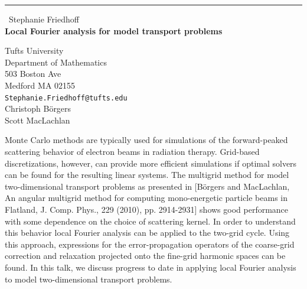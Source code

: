 \documentclass{report}
\begin{document}
\begin{center}
\rule{6in}{1pt} \
{\large Stephanie Friedhoff \\
{\bf Local Fourier analysis for model transport problems}}

Tufts University \\ Department of Mathematics \\ 503 Boston Ave \\ Medford MA 02155
\\
{\tt Stephanie.Friedhoff@tufts.edu}\\
Christoph B\"{o}rgers\\
Scott MacLachlan\end{center}

Monte Carlo methods are typically used for simulations of the
forward-peaked scattering behavior of electron beams in radiation
therapy. Grid-based discretizations, however, can provide more efficient
simulations if optimal solvers can be found for the resulting linear
systems. The multigrid method for model two-dimensional transport
problems as presented in [B\"{o}rgers and MacLachlan, An angular
multigrid method for computing mono-energetic particle beams in Flatland,
J. Comp. Phys., 229 (2010), pp. 2914-2931] shows good performance with
some dependence on the choice of scattering kernel. In order to
understand this behavior local Fourier analysis can be applied to the
two-grid cycle. Using this approach, expressions for the
error-propagation operators of the coarse-grid correction and relaxation
projected onto the fine-grid harmonic spaces can be found. In this talk,
we discuss progress to date in applying local Fourier analysis to model
two-dimensional transport problems.
\end{document}
